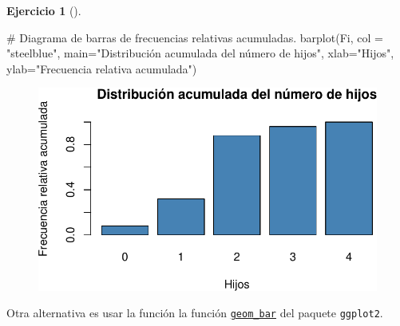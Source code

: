 \documentclass[
  a4paper,
]{scrreport}
\newenvironment{Shaded}{\begin{snugshade}}{\end{snugshade}}
\newcommand{\AttributeTok}[1]{\textcolor[rgb]{0.40,0.45,0.13}{#1}}
\newcommand{\CommentTok}[1]{\textcolor[rgb]{0.37,0.37,0.37}{#1}}
\newcommand{\FunctionTok}[1]{\textcolor[rgb]{0.28,0.35,0.67}{#1}}
\newcommand{\NormalTok}[1]{\textcolor[rgb]{0.00,0.23,0.31}{#1}}
\newcommand{\StringTok}[1]{\textcolor[rgb]{0.13,0.47,0.30}{#1}}
\theoremstyle{definition}
\newtheorem{exercise}{Ejercicio}[chapter]
\theoremstyle{remark}
\begin{document}
\begin{exercise}[]
\begin{enumerate}
\begin{tcolorbox}
\begin{figure}[H]
{  }

  \end{figure}

\begin{Shaded}
\begin{Highlighting}[]
\CommentTok{\# Diagrama de barras de frecuencias relativas acumuladas.}
\FunctionTok{barplot}\NormalTok{(Fi, }\AttributeTok{col =} \StringTok{"steelblue"}\NormalTok{, }\AttributeTok{main=}\StringTok{"Distribución acumulada del número de hijos"}\NormalTok{, }\AttributeTok{xlab=}\StringTok{"Hijos"}\NormalTok{, }\AttributeTok{ylab=}\StringTok{"Frecuencia relativa acumulada"}\NormalTok{)}
\end{Highlighting}
\end{Shaded}

  \begin{figure}[H]

  {\centering \includegraphics{03-frecuencias-graficos_files/figure-pdf/unnamed-chunk-6-4.pdf}

  }

  \end{figure}

  \end{tcolorbox}

  \begin{tcolorbox}[enhanced jigsaw, coltitle=black, left=2mm, colback=white, leftrule=.75mm, toptitle=1mm, breakable, bottomrule=.15mm, titlerule=0mm, bottomtitle=1mm, title=\textcolor{quarto-callout-tip-color}{\faLightbulb}\hspace{0.5em}{Solución 2}, arc=.35mm, toprule=.15mm, rightrule=.15mm, colframe=quarto-callout-tip-color-frame, opacityback=0, colbacktitle=quarto-callout-tip-color!10!white, opacitybacktitle=0.6]

  Otra alternativa es usar la función la función
  \href{https://aprendeconalf.es/manual-r/07-graficos.html\#diagramas-de-barras}{\texttt{geom\_bar}}
  del paquete \texttt{ggplot2}.


\end{tcolorbox}
\end{enumerate}
\end{exercise}
\end{document}

